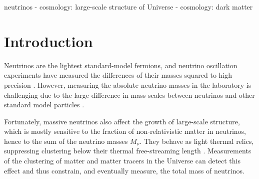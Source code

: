 \documentclass[useAMS, usenatbib]{mnras}
\begin{document}
\begin{keywords}
        neutrinos - cosmology: large-scale structure of Universe - cosmology: dark matter
\end{keywords}

\section{Introduction}

Neutrinos are the lightest standard-model fermions, and neutrino oscillation experiments have measured the differences of their masses squared to high precision \citep{Becker-Szendy_1992, Fukuda_1998, deSalas_17}. However, measuring the absolute neutrino masses in the laboratory is challenging due to the large difference in mass scales between neutrinos and other standard model particles \cite[although see][]{Wolf_2010}.


Fortunately, massive neutrinos %
also affect the growth of large-scale structure, which is mostly sensitive to the fraction of non-relativistic matter in neutrinos, hence to the sum of the neutrino masses $M_\nu$. They behave as light thermal relics, suppressing clustering below their thermal
free-streaming length \citep[e.g.][]{Lesgourgues_2006, Wong_2011}.
Measurements of the clustering of matter and matter tracers in the Universe can detect this effect and thus constrain, and eventually measure, the total mass of neutrinos.
\end{document}
